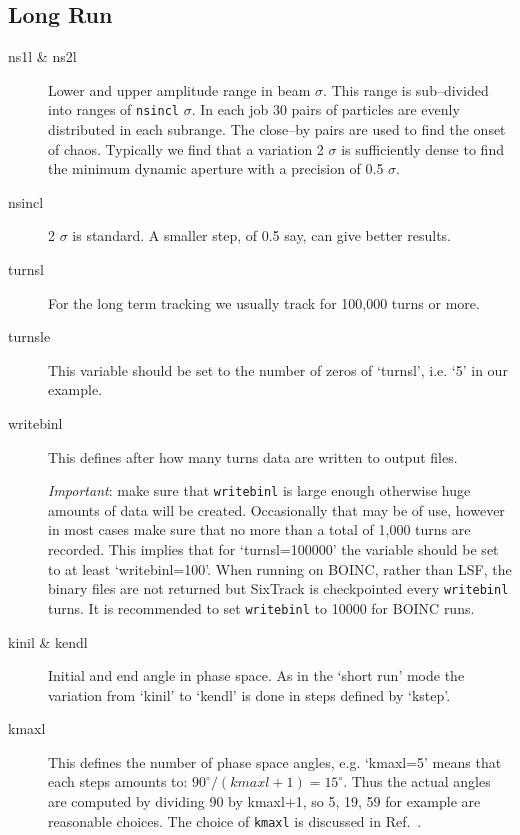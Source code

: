 \documentclass{cernatsnote}    %
\begin{document}
\subsection{Long Run}
\label{sec:run_six:longrun}
\begin{description}
\item [ns1l \& ns2l]
  Lower and upper amplitude range in beam $\sigma$. This range is
  sub--divided into ranges of {\tt nsincl} $\sigma$. In each job 30 pairs of
  particles are evenly distributed in each subrange. The
  close--by pairs are used to find the onset of chaos. Typically we
  find that a variation 2 $\sigma$ is sufficiently dense to find the
  minimum dynamic aperture with a precision of 0.5 $\sigma$.
\item [nsincl] 2 $\sigma$ is standard. A smaller step, of 0.5 say, 
can give better results.
\item [turnsl]
  For the long term tracking we usually track for 100,000 turns or more.
\item [turnsle]
  This variable should be set to the number of zeros of `turnsl',
  i.e. `5' in our example. 
\item [writebinl]
  This defines after how many turns data are written to output
  files.

  \emph{Important}: make sure that {\tt writebinl} is large enough
  otherwise huge amounts of data will be created. Occasionally that
  may be of use, however in most cases make sure that no more than a
  total of 1,000 turns are recorded. This implies that for
  `turnsl=100000' the variable should be set to at least `writebinl=100'.
  When running on BOINC, rather than LSF, the binary files are not returned
  but SixTrack is checkpointed every {\tt writebinl} turns. 
  It is recommended to set {\tt writebinl} to 10000 for BOINC runs.
\item[kinil \& kendl]
  Initial and end angle in phase space. As in the `short run' mode
  the variation from `kinil' to `kendl' is done in steps defined by
  `kstep'. 
\item [kmaxl]
  This defines the number of phase space angles, e.g. `kmaxl=5'
  means that each steps amounts to: $90^\circ/(kmaxl+1)=15^\circ$.
  Thus the actual angles are computed by dividing 90
  by kmaxl+1, so 5, 19, 59 for example are reasonable choices.
  The choice of {\tt kmaxl} is discussed in Ref.~\cite{fandmpaper}.
\end{description}
\end{document}
